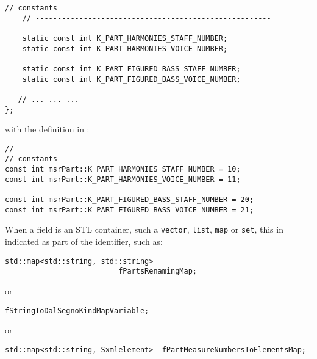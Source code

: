 \begin{itemize}
\begin{lstlisting}[language=CPlusPlus]
    // constants
    // ------------------------------------------------------

    static const int K_PART_HARMONIES_STAFF_NUMBER;
    static const int K_PART_HARMONIES_VOICE_NUMBER;

    static const int K_PART_FIGURED_BASS_STAFF_NUMBER;
    static const int K_PART_FIGURED_BASS_VOICE_NUMBER;

   // ... ... ...
};
\end{lstlisting}

with the definition in :
\begin{lstlisting}[language=CPlusPlus]
//______________________________________________________________________________
// constants
const int msrPart::K_PART_HARMONIES_STAFF_NUMBER = 10;
const int msrPart::K_PART_HARMONIES_VOICE_NUMBER = 11;

const int msrPart::K_PART_FIGURED_BASS_STAFF_NUMBER = 20;
const int msrPart::K_PART_FIGURED_BASS_VOICE_NUMBER = 21;
\end{lstlisting}

\end{itemize}

When a field is an STL container, such a {\tt vector}, {\tt list}, {\tt map} or {\tt set}, this in indicated as part of the identifier, such as:
\begin{lstlisting}[language=CPlusPlus]
    std::map<std::string, std::string>
                          fPartsRenamingMap;
\end{lstlisting}
or
\begin{lstlisting}[language=CPlusPlus]
                          fStringToDalSegnoKindMapVariable;
\end{lstlisting}
or
\begin{lstlisting}[language=CPlusPlus]
    std::map<std::string, Sxmlelement>  fPartMeasureNumbersToElementsMap;
\end{lstlisting}

